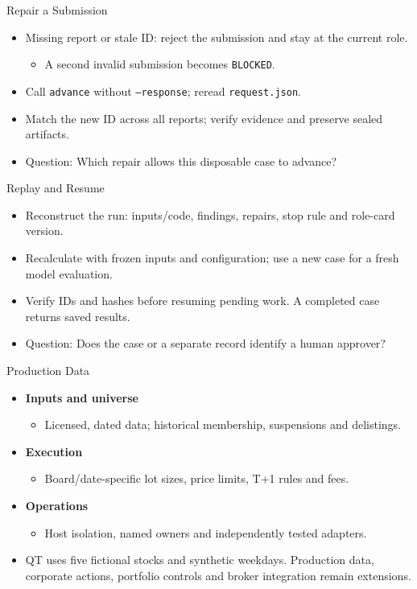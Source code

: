\begin{frame}{Repair a Submission\handsup}
\begin{itemize}
\item Missing report or stale ID: reject the submission and stay at the current role.
\begin{itemize}
\item A second invalid submission becomes \texttt{BLOCKED}.
\end{itemize}
\item Call \texttt{advance} without \texttt{--response}; reread \texttt{request.json}.
\item Match the new ID across all reports; verify evidence and preserve sealed artifacts.
\item Question: Which repair allows this disposable case to advance?
\end{itemize}
\end{frame}

\begin{frame}{Replay and Resume\handsup}
\begin{itemize}
\item Reconstruct the run: inputs/code, findings, repairs, stop rule and role-card version.
\item Recalculate with frozen inputs and configuration; use a new case for a fresh model evaluation.
\item Verify IDs and hashes before resuming pending work. A completed case returns saved results.
\item Question: Does the case or a separate record identify a human approver?
\end{itemize}
\end{frame}

\begin{frame}{Production Data}
\begin{itemize}
\item \textbf{Inputs and universe}
\begin{itemize}
\item Licensed, dated data; historical membership, suspensions and delistings.
\end{itemize}
\item \textbf{Execution}
\begin{itemize}
\item Board/date-specific lot sizes, price limits, T+1 rules and fees.
\end{itemize}
\item \textbf{Operations}
\begin{itemize}
\item Host isolation, named owners and independently tested adapters.
\end{itemize}
\item QT uses five fictional stocks and synthetic weekdays. Production data, corporate actions, portfolio controls and broker integration remain extensions.
\end{itemize}
\end{frame}

